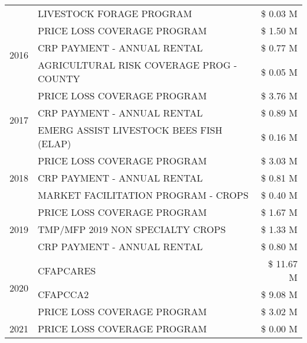 \begin{tabular}{llr}
 & LIVESTOCK FORAGE PROGRAM & \$ 0.03 M \\
\cline{1-3}
\multirow[t]{3}{*}{2016} & PRICE LOSS COVERAGE PROGRAM                   & \$ 1.50 M \\
 & CRP PAYMENT - ANNUAL RENTAL                   & \$ 0.77 M \\
 & AGRICULTURAL RISK COVERAGE PROG - COUNTY      & \$ 0.05 M \\
\cline{1-3}
\multirow[t]{3}{*}{2017} & PRICE LOSS COVERAGE PROGRAM & \$ 3.76 M \\
 & CRP PAYMENT - ANNUAL RENTAL & \$ 0.89 M \\
 & EMERG ASSIST LIVESTOCK BEES FISH (ELAP) & \$ 0.16 M \\
\cline{1-3}
\multirow[t]{3}{*}{2018} & PRICE LOSS COVERAGE PROGRAM & \$ 3.03 M \\
 & CRP PAYMENT - ANNUAL RENTAL & \$ 0.81 M \\
 & MARKET FACILITATION PROGRAM - CROPS & \$ 0.40 M \\
\cline{1-3}
\multirow[t]{3}{*}{2019} & PRICE LOSS COVERAGE PROGRAM & \$ 1.67 M \\
 & TMP/MFP 2019 NON SPECIALTY CROPS & \$ 1.33 M \\
 & CRP PAYMENT - ANNUAL RENTAL & \$ 0.80 M \\
\cline{1-3}
\multirow[t]{3}{*}{2020} & CFAPCARES & \$ 11.67 M \\
 & CFAPCCA2 & \$ 9.08 M \\
 & PRICE LOSS COVERAGE PROGRAM & \$ 3.02 M \\
\cline{1-3}
2021 & PRICE LOSS COVERAGE PROGRAM & \$ 0.00 M \\
\cline{1-3}
\bottomrule
\end{tabular}

